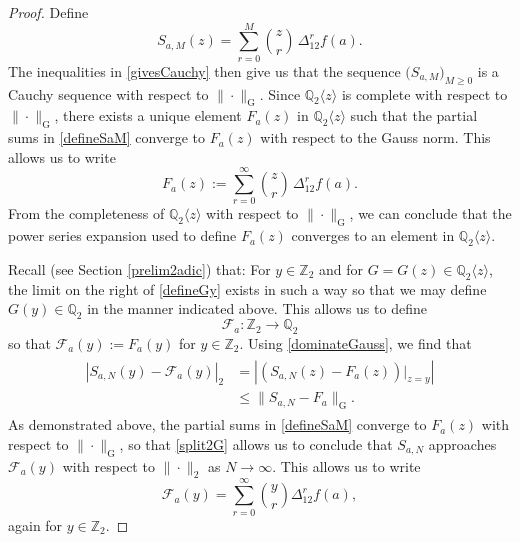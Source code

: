 \documentclass[11pt,letterpaper]{amsart}
\begin{document}
\begin{proof}
 Define 
\begin{equation}\label{defineSaM}
 S_{a, M}(z) = \sum_{r=0}^{M} \binom{z}{r} \, \Delta_{12}^{r} f(a). 
\end{equation}
 The inequalities in \eqref{givesCauchy} then give us that 
 the sequence $\big( S_{a, M} \big)_{M \geq 0}$ is a Cauchy sequence with respect to $\| \cdot \|_{\operatorname{G}}$. 
 Since $\mathbb{Q}_{2}\langle z \rangle$ is complete with respect to $\| \cdot \|_{\operatorname{G}}$, 
 there exists a unique element $F_{a}(z)$ in 
 $\mathbb{Q}_{2}\langle z \rangle$
 such that the partial sums in \eqref{defineSaM}
 converge to $F_{a}(z)$
 with respect to the Gauss norm. 
 This allows us to write 
\begin{equation}\label{defineFaz}
 F_{a}(z) := \sum_{r=0}^{\infty} \binom{z}{r} \, \Delta_{12}^{r} f(a). 
\end{equation} 
 From the completeness of $ \mathbb{Q}_{2}\langle z \rangle$ with 
 respect to $\| \cdot \|_{\operatorname{G}}$, 
 we can conclude that the power series expansion used to define $F_{a}(z)$
 converges to an element in $\mathbb{Q}_{2}\langle z \rangle$. 

 Recall (see Section \ref{prelim2adic}) that: For $y \in \mathbb{Z}_{2}$ and for $G = G(z) \in \mathbb{Q}_{2}\langle z \rangle$, the limit on 
 the right of \eqref{defineGy} exists 
 in such a way so that we may define $G(y) \in \mathbb{Q}_{2}$
 in the manner indicated above. 
 This allows us to define 
\begin{equation}\label{Facolon}
 \mathcal{F}_{a}\colon \mathbb{Z}_{2} \to \mathbb{Q}_{2} 
\end{equation}
 so that 
 $ \mathcal{F}_{a}(y) := F_a(y) $ 
 for $y \in \mathbb{Z}_{2}$. 
 Using \eqref{dominateGauss}, we find that 
\begin{align}
\begin{split}
 \left| S_{a, N}(y) - \mathcal{F}_{a}(y) \right|_{2} 
 & = \left| \left( S_{a, N}(z) - F_{a}(z) \right) |_{z = y} \right| \\ 
 & \leq \| S_{a, N} - F_{a} \|_{\operatorname{G}}. 
\end{split}\label{split2G}
\end{align}
 As demonstrated above, the partial sums in \eqref{defineSaM}
 converge to $F_{a}(z)$
 with respect to $\| \cdot \|_{\operatorname{G}}$, 
 so that \eqref{split2G}
 allows us to conclude that $S_{a, N}$ approaches $\mathcal{F}_{a}(y)$ with respect to $\| \cdot \|_{2}$
 as $N \to \infty$. This allows us to write 
\begin{equation}\label{definecalF} 
 \mathcal{F}_{a}(y) = \sum_{r=0}^{\infty} \binom{y}{r} \Delta_{12}^{r} f(a), 
\end{equation}
 again for $y \in \mathbb{Z}_{2}$. 


\end{proof}
\end{document}
